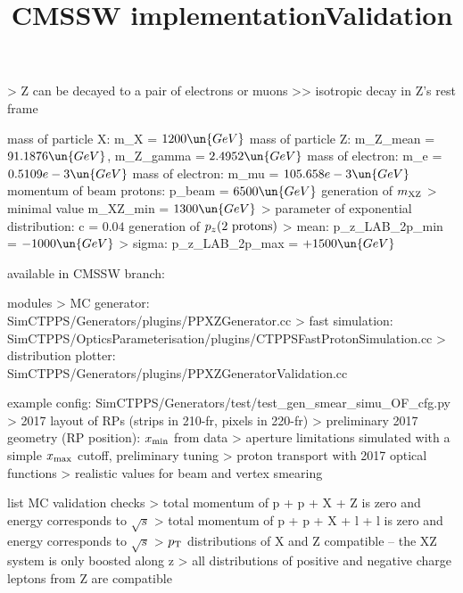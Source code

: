 \>> Z can be decayed to a pair of electrons or muons
\>>> isotropic decay in Z's rest frame


\newpage %

\> mass of particle X: m\_X = $1200\un{GeV}$
\> mass of particle Z: m\_Z\_mean = $91.1876\un{GeV}$, m\_Z\_gamma = $2.4952\un{GeV}$
\> mass of electron: m\_e = $0.5109e-3\un{GeV}$
\> mass of electron: m\_mu = $105.658e-3\un{GeV}$
\> momentum of beam protons: p\_beam = $6500\un{GeV}$
\> generation of $m_{\rm XZ}$
\>> minimal value m\_XZ\_min = $1300\un{GeV}$
\>> parameter of exponential distribution: c = $0.04$
\> generation of $p_z(\hbox{2 protons})$
\>> mean: p\_z\_LAB\_2p\_min = $-1000\un{GeV}$
\>> sigma: p\_z\_LAB\_2p\_max = $+1500\un{GeV}$


\newpage %
\title{CMSSW implementation}


\> available in CMSSW branch:\\ 

\NormalFonts

\> modules
\>> MC generator:\\ SimCTPPS/Generators/plugins/PPXZGenerator.cc
\>> fast simulation:\\ SimCTPPS/OpticsParameterisation/plugins/CTPPSFastProtonSimulation.cc
\>> distribution plotter:\\ SimCTPPS/Generators/plugins/PPXZGeneratorValidation.cc

\> example config: SimCTPPS/Generators/test/test\_gen\_smear\_simu\_OF\_cfg.py
\>> 2017 layout of RPs (strips in 210-fr, pixels in 220-fr)
\>> preliminary 2017 geometry (RP position): $x_{\rm min}$ from data
\>> aperture limitations simulated with a simple $x_{\rm max}$ cutoff, preliminary tuning
\>> proton transport with 2017 optical functions
\>> realistic values for beam and vertex smearing


\newpage %
\title{Validation}

\> list MC validation checks
\>> total momentum of p + p + X + Z is zero and energy corresponds to $\sqrt s$
\>> total momentum of p + p + X + l + l is zero and energy corresponds to $\sqrt s$
\>> $p_{\rm T}$ distributions of X and Z compatible -- the XZ system is only boosted along z
\>> all distributions of positive and negative charge leptons from Z are compatible

